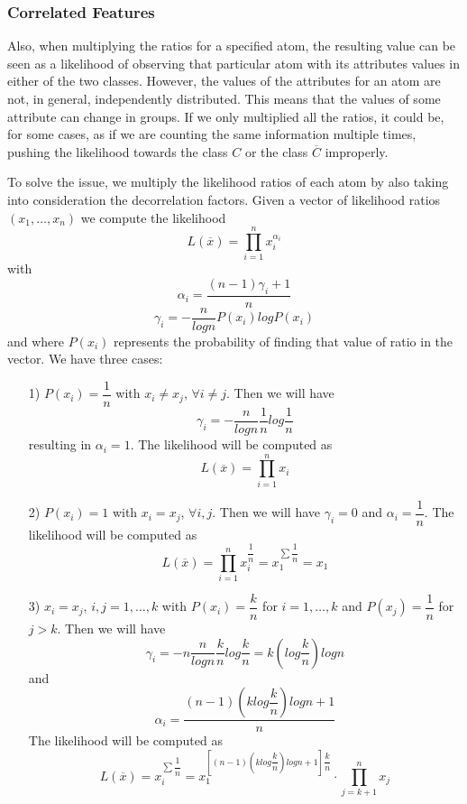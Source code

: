 \subsubsection*{Correlated Features}

Also, when multiplying the ratios for a specified atom, the resulting value can be seen as a likelihood of observing that particular atom with its attributes values in either of the two classes. However, the values of the attributes for an atom are not, in general, independently distributed. This means that the values of some attribute can change in groups. If we only multiplied all the ratios, it could be, for some cases, as if we are counting the same information multiple times, pushing the likelihood towards the class $C$ or the class $\overline{C}$ improperly.

To solve the issue, we multiply the likelihood ratios of each atom by also taking into consideration the decorrelation factors.
Given a vector of likelihood ratios $(x_{1},\ldots,x_{n})$ we compute the likelihood $$ L(\overline{x}) = \prod\limits_{i=1}^{n} x_{i}^{\alpha_{i}} $$ with $$ \alpha_{i} = \dfrac{(n-1)\gamma_{i}+1}{n} $$ $$ \gamma_{i} = - \dfrac{n}{log n} P(x_{i})log P(x_{i}) $$ and where $P(x_{i})$ represents the probability of finding that value of ratio in the vector.
We have three cases:

\begin{itemize}

\item[1)] $P(x_{i}) = \dfrac{1}{n} $ with $x_{i} \neq x_{j}$, $ \forall i \neq j $.
Then we will have $$ \gamma_{i} = - \dfrac{n}{log n} \dfrac{1}{n} log\dfrac{1}{n} $$ resulting in $\alpha_{i} = 1$.
The likelihood will be computed as $$L(\overline{x}) = \prod\limits_{i=1}^{n} x_{i} $$

\item[2)] $P(x_{i}) = 1 $ with $x_{i} = x_{j}$, $ \forall i,j $.
Then we will have $ \gamma_{i} = 0 $ and $\alpha_{i} = \dfrac{1}{n} $.
The likelihood will be computed as $$L(\overline{x}) = \prod\limits_{i=1}^{n} x_{i}^{\dfrac{1}{n}} = x_{1}^{\sum \dfrac{1}{n}} = x_{1} $$

\item[3)]  $x_{i} = x_{j}$, $ i,j = 1,\ldots,k $ with $P(x_{i}) = \dfrac{k}{n} $ for $i = 1,\ldots,k$ and $P(x_{j}) = \dfrac{1}{n}$ for $j > k$.
Then we will have $$ \gamma_{i} = -n \dfrac{n}{log n} \dfrac{k}{n} log \dfrac{k}{n} = k (log \dfrac{k}{n})log n $$ and 
$$ \alpha_{i} = \dfrac{(n-1)(k log \dfrac{k}{n})log n + 1}{n} $$
The likelihood will be computed as $$L(\overline{x}) = x_{i}^{\sum \dfrac{1}{n}} = x_{1}^{\left[ (n-1)(k log \dfrac{k}{n})log n + 1 \right] \dfrac{k}{n}} \cdot \prod\limits_{j=k+1}^{n} x_{j}  $$

\end{itemize}

